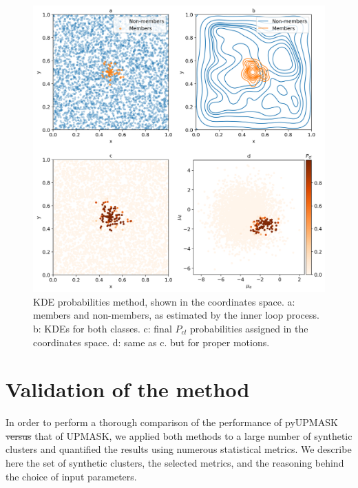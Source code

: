 \documentclass[draft]{aa}
\providecommand{\DIFaddtex}[1]{{\protect\color{blue}\uwave{#1}}} %
\providecommand{\DIFdeltex}[1]{{\protect\color{red}\sout{#1}}}                      %
\providecommand{\DIFaddbegin}{} %
\providecommand{\DIFaddend}{} %
\providecommand{\DIFdelbegin}{} %
\providecommand{\DIFdelend}{} %
\providecommand{\DIFadd}[1]{\texorpdfstring{\DIFaddtex{#1}}{#1}} %
\providecommand{\DIFdel}[1]{\texorpdfstring{\DIFdeltex{#1}}{}} %
\newcommand{\DIFscaledelfig}{0.5}
\newlength{\DIFdelgraphicswidth} %
\newlength{\DIFdelgraphicsheight} %
\newcommand{\DIFaddincludegraphics}[2][]{{\color{blue}\fbox{\DIFOincludegraphics[#1]{#2}}}} %
\newcommand{\DIFdelincludegraphics}[2][]{%
\sbox{\DIFdelgraphicsbox}{\DIFOincludegraphics[#1]{#2}}%
\settoboxwidth{\DIFdelgraphicswidth}{\DIFdelgraphicsbox} %
\settoboxtotalheight{\DIFdelgraphicsheight}{\DIFdelgraphicsbox} %
\scalebox{\DIFscaledelfig}{%
\parbox[b]{\DIFdelgraphicswidth}{\usebox{\DIFdelgraphicsbox}\\[-\baselineskip] \rule{\DIFdelgraphicswidth}{0em}}\llap{\resizebox{\DIFdelgraphicswidth}{\DIFdelgraphicsheight}{%
\setlength{\unitlength}{\DIFdelgraphicswidth}%
\begin{picture}(1,1)%
\thicklines\linethickness{2pt} %
{\color[rgb]{1,0,0}\put(0,0){\framebox(1,1){}}}%
{\color[rgb]{1,0,0}\put(0,0){\line( 1,1){1}}}%
{\color[rgb]{1,0,0}\put(0,1){\line(1,-1){1}}}%
\end{picture}%
}\hspace*{3pt}}} %
} %
\DeclareRobustCommand{\DIFaddbegin}{\DIFOaddbegin \let\includegraphics\DIFaddincludegraphics} %
\DeclareRobustCommand{\DIFaddend}{\DIFOaddend \let\includegraphics\DIFOincludegraphics} %
\DeclareRobustCommand{\DIFdelbegin}{\DIFOdelbegin \let\includegraphics\DIFdelincludegraphics} %
\DeclareRobustCommand{\DIFdelend}{\DIFOaddend \let\includegraphics\DIFOincludegraphics} %
\begin{document}
  \begin{figure}
  \includegraphics[width=\hsize]{figs/KDE.png}
  \caption{KDE probabilities method, shown in the coordinates space. a:
  members and non-members, as estimated by the inner loop process. b:
  KDEs for both classes. c: final $P_{cl} $ probabilities assigned in the
  coordinates space. d: same as c. but for proper motions.}
  \label{fig:KDE}
  \end{figure}



\section{Validation of the method}
 \label{sec:validation}

 In order to perform a thorough comparison of the performance of pyUPMASK
 \DIFdelbegin \DIFdel{versus }\DIFdelend \DIFaddbegin \DIFadd{with }\DIFaddend that of UPMASK, we applied both methods to a large number of synthetic
 clusters and quantified the results using numerous statistical metrics.
 We describe here the set of synthetic clusters, the selected metrics, and the
 reasoning behind the choice of input parameters.
\end{document}

